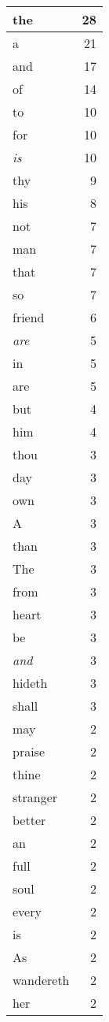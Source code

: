 \begin{center}
\begin{longtable}{l|r}
the & 28\\ \hline 
a & 21\\ \hline 
and & 17\\ \hline 
of & 14\\ \hline 
to & 10\\ \hline 
for & 10\\ \hline 
\emph{is} & 10\\ \hline 
thy & 9\\ \hline 
his & 8\\ \hline 
not & 7\\ \hline 
man & 7\\ \hline 
that & 7\\ \hline 
so & 7\\ \hline 
friend & 6\\ \hline 
\emph{are} & 5\\ \hline 
in & 5\\ \hline 
are & 5\\ \hline 
but & 4\\ \hline 
him & 4\\ \hline 
thou & 3\\ \hline 
day & 3\\ \hline 
own & 3\\ \hline 
A & 3\\ \hline 
than & 3\\ \hline 
The & 3\\ \hline 
from & 3\\ \hline 
heart & 3\\ \hline 
be & 3\\ \hline 
\emph{and} & 3\\ \hline 
hideth & 3\\ \hline 
shall & 3\\ \hline 
may & 2\\ \hline 
praise & 2\\ \hline 
thine & 2\\ \hline 
stranger & 2\\ \hline 
better & 2\\ \hline 
an & 2\\ \hline 
full & 2\\ \hline 
soul & 2\\ \hline 
every & 2\\ \hline 
is & 2\\ \hline 
As & 2\\ \hline 
wandereth & 2\\ \hline 
her & 2\\ \hline 

\end{longtable}
\end{center}

